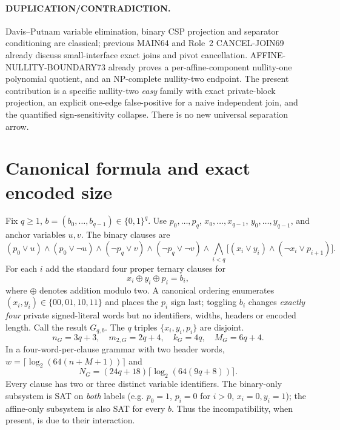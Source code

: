 \documentclass[11pt]{article}
\begin{document}
\paragraph{DUPLICATION/CONTRADICTION.}
Davis--Putnam variable elimination, binary CSP projection and
separator conditioning are classical; previous MAIN64 and Role~2
CANCEL-JOIN69 already discuss small-interface exact joins and
pivot cancellation. AFFINE-NULLITY-BOUNDARY73 already proves
a per-affine-component nullity-one polynomial quotient, and an
NP-complete nullity-two endpoint. The present contribution is a
specific nullity-two \emph{easy} family with exact private-block
projection, an explicit one-edge false-positive for a
naive independent join, and the quantified sign-sensitivity collapse.
There is no new universal separation arrow.

\section{Canonical formula and exact encoded size}
Fix $q\ge1$, $b=(b_0,\ldots,b_{q-1})\in\{0,1\}^q$.
Use
$p_0,\ldots,p_q$, $x_0,\ldots,x_{q-1}$,
$y_0,\ldots,y_{q-1}$, and anchor variables $u,v$.
The binary clauses are
\[
(p_0\vee u)\land(p_0\vee\neg u)
\land(\neg p_q\vee v)\land(\neg p_q\vee\neg v)
\land\bigwedge_{i<q}\bigl[(x_i\vee y_i)
\land(\neg x_i\vee p_{i+1})\bigr].
\tag{1}
\]
For each $i$ add the standard four proper ternary clauses for
\[
x_i\oplus y_i\oplus p_i=b_i,
\tag{2}
\]
where $\oplus$ denotes addition modulo two. A canonical ordering
enumerates $(x_i,y_i)\in\{00,01,10,11\}$ and places the
$p_i$ sign last; toggling $b_i$ changes \emph{exactly four}
private signed-literal words but no identifiers, widths, headers or
encoded length.
Call the result $G_{q,b}$. The $q$ triples
$\{x_i,y_i,p_i\}$ are disjoint.
\[
n_G=3q+3,\quad m_{2,G}=2q+4,\quad
k_G=4q,\quad M_G=6q+4.
\tag{3}
\]
In a four-word-per-clause grammar with two header words,
$w=\lceil\log_2(64(n+M+1))\rceil$ and
\[
N_G=(24q+18)\lceil\log_2(64(9q+8))\rceil.
\tag{4}
\]
Every clause has two or three distinct variable identifiers.
The binary-only subsystem is SAT on \emph{both} labels
(e.g. $p_0=1$, $p_i=0$ for $i>0$, $x_i=0,y_i=1$);
the affine-only subsystem is also SAT for every $b$.
Thus the incompatibility, when present, is due to their interaction.
\end{document}
